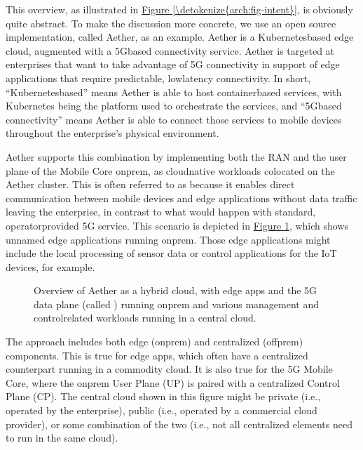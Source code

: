 \documentclass[a4paper,11pt,english]{sphinxmanual}
\let\sphinxpxdimen\pdfpxdimen\else\newdimen\sphinxpxdimen
\begin{document}
\sphinxAtStartPar
This overview, as illustrated in \hyperref[\detokenize{arch:fig-intent}]{Figure \ref{\detokenize{arch:fig-intent}}}, is
obviously quite abstract. To make the discussion more concrete, we use
an open source implementation, called Aether, as an example. Aether
is a Kubernetes\sphinxhyphen{}based edge cloud, augmented with a 5G\sphinxhyphen{}based
connectivity service. Aether is targeted at enterprises that want to
take advantage of 5G connectivity in support of edge applications that
require predictable, low\sphinxhyphen{}latency connectivity. In short,
“Kubernetes\sphinxhyphen{}based” means Aether is able to host container\sphinxhyphen{}based
services, with Kubernetes being the platform used to orchestrate the
services, and “5G\sphinxhyphen{}based connectivity” means Aether is able to connect
those services to mobile devices throughout the enterprise’s physical
environment.

\sphinxAtStartPar
Aether supports this combination by implementing both the RAN and the
user plane of the Mobile Core on\sphinxhyphen{}prem, as cloud\sphinxhyphen{}native workloads
co\sphinxhyphen{}located on the Aether cluster. This is often referred to as  because it enables direct communication between mobile
devices and edge applications without data traffic leaving the
enterprise, in contrast to what would happen with standard,
operator\sphinxhyphen{}provided 5G service. This scenario is depicted in
\hyperref[\detokenize{arch:fig-hybrid}]{Figure \ref{\detokenize{arch:fig-hybrid}}}, which shows unnamed edge
applications running on\sphinxhyphen{}prem. Those edge applications might include
the local processing of sensor data or control applications for the
IoT devices, for example.

\begin{figure}[ht]
\centering
\capstart

\noindent\sphinxincludegraphics[width=700\sphinxpxdimen]{{Slide31}.png}
\caption{Overview of Aether as a hybrid cloud, with edge apps and the 5G
data plane (called ) running on\sphinxhyphen{}prem and various
management and control\sphinxhyphen{}related workloads running in a central
cloud.}\label{\detokenize{arch:id16}}\label{\detokenize{arch:fig-hybrid}}\end{figure}

\sphinxAtStartPar
The approach includes both edge (on\sphinxhyphen{}prem) and centralized (off\sphinxhyphen{}prem)
components. This is true for edge apps, which often have a centralized
counterpart running in a commodity cloud. It is also true for the 5G
Mobile Core, where the on\sphinxhyphen{}prem User Plane (UP) is paired with a
centralized Control Plane (CP). The central cloud shown in this figure
might be private (i.e., operated by the enterprise), public (i.e.,
operated by a commercial cloud provider), or some combination of the
two (i.e., not all centralized elements need to run in the same
cloud).
\end{document}
